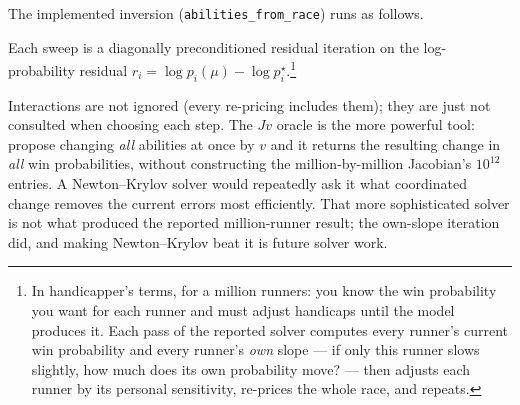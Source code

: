 \documentclass[11pt]{article}
\begin{document}
The implemented inversion (\texttt{abilities\_from\_race}) runs as follows.

\begin{center}
\end{center}

Each sweep is a diagonally preconditioned residual iteration on the
log-probability residual
$r_i=\log p_i(\mu)-\log p^{\star}_i$.\footnote{In handicapper's terms,
for a million runners: you know the win probability you want for each
runner and must adjust handicaps until the model produces it. Each pass
of the reported solver computes every runner's current win probability
and every runner's \emph{own} slope --- if only this runner slows
slightly, how much does its own probability move? --- then adjusts each
runner by its personal sensitivity, re-prices the whole race, and
repeats.}

Interactions are not ignored (every re-pricing includes them);
they are just not consulted when choosing each step. The $Jv$ oracle is
the more powerful tool: propose changing \emph{all} abilities at once by
$v$ and it returns the resulting change in \emph{all} win probabilities,
without constructing the million-by-million Jacobian's $10^{12}$
entries. A Newton--Krylov solver would repeatedly ask it what
coordinated change removes the current errors most efficiently. That
more sophisticated solver is not what produced the reported
million-runner result; the own-slope iteration did, and making
Newton--Krylov beat it is future solver work.
\end{document}
